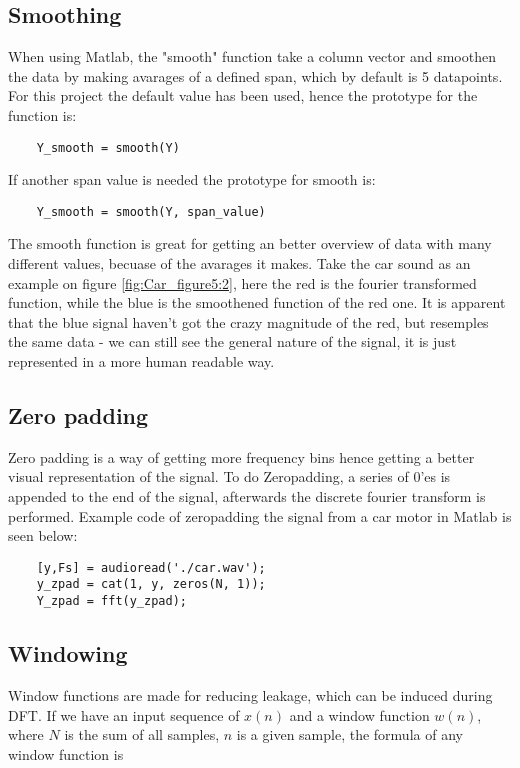 \subsection{Smoothing}

When using Matlab, the "smooth" function take a column vector and smoothen the data by making avarages of a defined span, which by default is 5 datapoints\cite[smooth]{MATLAB_DOC}. 
For this project the default value has been used, hence the prototype for the function is:

\begin{verbatim}
	Y_smooth = smooth(Y)
\end{verbatim}
If another span value is needed the prototype for smooth is:


\begin{verbatim}
	Y_smooth = smooth(Y, span_value)
\end{verbatim}

The smooth function is great for getting an better overview of data with many different values, becuase of the avarages it makes. 
Take the car sound as an example on figure \ref{fig:Car_figure5:2}, here the red is the fourier transformed function, while the blue is the smoothened function of the red one. 
It is apparent that the blue signal haven't got the crazy magnitude of the red, but resemples the same data - we can still see the general nature of the signal, it is just represented in a more human readable way.

\subsection{Zero padding}

Zero padding is a way of getting more frequency bins hence getting a better visual representation of the signal. 
To do Zeropadding, a series of 0'es is appended to the end of the signal, afterwards the discrete fourier transform is performed. 
Example code of zeropadding the signal from a car motor in Matlab is seen below:

\begin{verbatim}
	[y,Fs] = audioread('./car.wav');
	y_zpad = cat(1, y, zeros(N, 1));
	Y_zpad = fft(y_zpad);
\end{verbatim}

\subsection{Windowing}
\label{sec:windowing}
Window functions are made for reducing leakage, which can be induced during DFT. If we have an input sequence of $x(n)$ and a window function $w(n)$, where $N$ is the sum of all samples, $n$ is a given sample, the formula of any window function is

